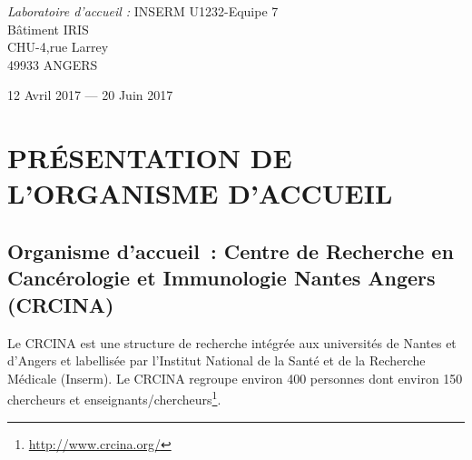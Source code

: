 \documentclass[a4paper,10pt]{article}
\newcommand\tabA[1][0.5cm]{\hspace*{#1}}
\newcommand\tabC[1][2cm]{\hspace*{#1}}
\begin{document}
\begin{titlepage}
\begin{sffamily}
\begin{center}
\begin{minipage}{9\textwidth}
\begin{doublespace}
\begin{tabular}{cl}
    \end{tabular}
     \end{doublespace}
    \emph{Laboratoire d'accueil :} \tabC \tabA \textsc{INSERM U1232}-Equipe 7
    \\\tabC \tabC \tabC \tabA Bâtiment IRIS 
    \\\tabC \tabC \tabC \tabA CHU-4,rue Larrey 
    \\\tabC \tabC \tabC \tabA 49933 ANGERS
    \end{minipage}
    \vspace*{\fill}
%  

    {\large 12 Avril 2017 — 20 Juin 2017}

  \end{center}
  \end{sffamily}
\end{titlepage}
\newpage
\tableofcontents
\newpage
\listoffigures
\newpage
\listoftables
\newpage
{}

\section{PR\'{E}SENTATION DE L'ORGANISME D'ACCUEIL }
\subsection{Organisme d’accueil : Centre de Recherche en Cancérologie et Immunologie Nantes Angers (CRCINA)}
Le CRCINA est une structure de recherche intégrée aux universités de Nantes et d’Angers et labellisée par l’Institut National de la Santé et de la Recherche Médicale (Inserm). 
Le CRCINA regroupe environ 400 personnes dont environ 150 chercheurs et enseignants/chercheurs\footnote{\url{http://www.crcina.org/}}.
\end{document}
